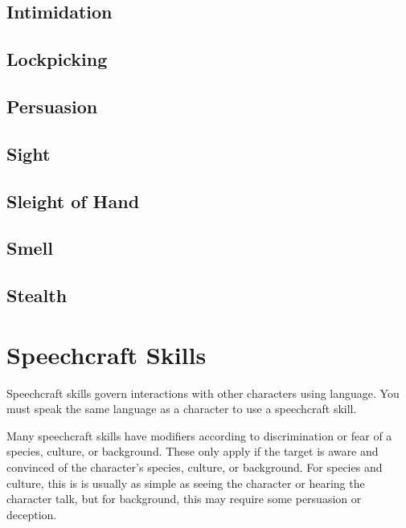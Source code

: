 \begin{multicols*}{2}
    \subsection*{Intimidation}\label{skill:intimidation}

    \subsection*{Lockpicking}\label{skill:lockpicking}

    \subsection*{Persuasion}\label{skill:persuasion}

    \subsection*{Sight}\label{skill:sight}

    \subsection*{Sleight of Hand}\label{skill:sleight-of-hand}

    \subsection*{Smell}\label{skill:smell}

    \subsection*{Stealth}\label{skill:stealth}

    \section{Speechcraft Skills}\label{speechcraft-skills}
    Speechcraft skills govern interactions with other characters using language.
    You must speak the same language as a character to use a speechcraft skill.

    Many speechcraft skills have modifiers according to discrimination or fear of
    a species, culture, or background. These only apply if the target is aware and
    convinced of the character's species, culture, or background. For species and
    culture, this is is usually as simple as seeing the character or hearing the
    character talk, but for background, this may require some persuasion or
    deception.


\end{multicols*}
